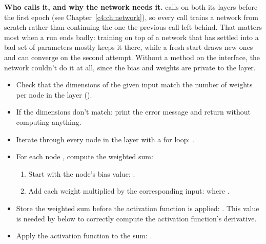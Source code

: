 \textbf{Who calls it, and why the network needs it.}  calls
 on both its layers before the first epoch (see Chapter~\ref{c4:ch:network}), so
every call trains a network from scratch rather than continuing the one the previous call left
behind. That matters most when a run ends badly: training on top of a network that has settled
into a bad set of parameters mostly keeps it there, while a fresh start draws new ones and can
converge on the second attempt. Without a method on the interface, the network couldn't do it at
all, since the bias and weights are private to the layer.

\label{c5:ex:11}
\begin{itemize}
  \item Check that the dimensions of the given input match the number of weights per node in the
    layer ().
  \item If the dimensions don't match: print the error message
     and return  without
    computing anything.
\end{itemize}

\begin{itemize}
  \item Iterate through every node in the layer with a for loop:
    .
  \item For each node , compute the weighted sum:
  \begin{enumerate}
    \item Start with the node's bias value: .
    \item Add each weight multiplied by the corresponding input:
       where
      .
  \end{enumerate}
  \item Store the weighted sum before the activation function is applied:\newline
    . This value is needed by  below to
    correctly compute the activation function's derivative.
  \item Apply the activation function to the sum:
    .
\end{itemize}

